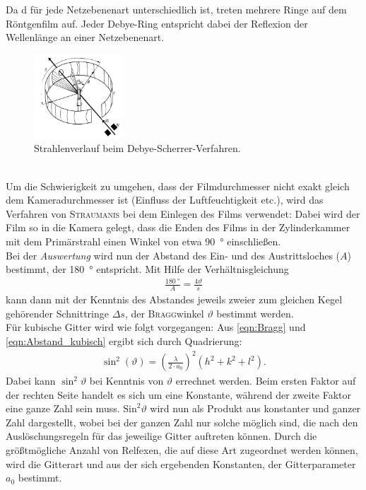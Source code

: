 \documentclass[a4paper,twoside,final]{article}
\begin{document}
Da d für jede Netzebenenart unterschiedlich ist, treten mehrere Ringe auf dem Röntgenfilm auf. Jeder Debye-Ring entspricht dabei der Reflexion der Wellenlänge an einer Netzebenenart.
\begin{figure}[htp]
    \centering
    \includegraphics[width=0.3\textwidth]{Abbildungen/Debye-Sherrer-Kamera.pdf}
    \caption{Strahlenverlauf beim Debye-Scherrer-Verfahren.~\cite[S.375]{Kleber}}
    \label{fig:Debye-Kamera}
\end{figure}\\
Um die Schwierigkeit zu umgehen, dass der Filmdurchmesser nicht exakt gleich dem Kameradurchmesser ist (Einfluss der Luftfeuchtigkeit etc.), wird das Verfahren von \textsc{Straumanis} bei dem Einlegen des Films verwendet: Dabei wird der Film so in die Kamera gelegt, dass die Enden des Films in der Zylinderkammer mit dem Primärstrahl einen Winkel von etwa \SI{90}{\degree} einschließen.\\
Bei der \textit{Auswertung} wird nun der Abstand des Ein- und des Austrittsloches ($A$) bestimmt, der \SI{180}{\degree} entspricht. Mit Hilfe der Verhältnisgleichung
\begin{align}
  \frac{\SI{180}{\degree}}{A} = \frac{4\vartheta}{ s}\label{eqn:Verhältnisgleichung}
\end{align}
kann dann mit der Kenntnis des Abstandes jeweils zweier zum gleichen Kegel gehörender Schnittringe $\Delta s$, der \textsc{Bragg}winkel $\vartheta$ bestimmt werden. \\
Für kubische Gitter wird wie folgt vorgegangen: Aus \eqref{eqn:Bragg} und \eqref{eqn:Abstand_kubisch} ergibt sich durch Quadrierung:
\begin{align}\label{equ:Auswertung}
  \sin^2(\vartheta) = \left(\frac{\lambda}{2\cdot a_0}\right)^2 (h^2+k^2+l^2).
\end{align}
Dabei kann $\sin^2\vartheta$ bei Kenntnis von $\vartheta$ errechnet werden. Beim ersten Faktor auf der rechten Seite handelt es sich um eine Konstante, während der zweite Faktor eine ganze Zahl sein muss. $\text{Sin}^2\vartheta$ wird nun als Produkt aus konstanter und ganzer Zahl dargestellt, wobei bei der ganzen Zahl nur solche möglich sind, die nach den Auslöschungsregeln für das jeweilige Gitter auftreten können. Durch die größtmögliche Anzahl von Relfexen, die auf diese Art zugeordnet werden können, wird die Gitterart und aus der sich ergebenden Konstanten, der Gitterparameter $a_0$ bestimmt.
\end{document}

